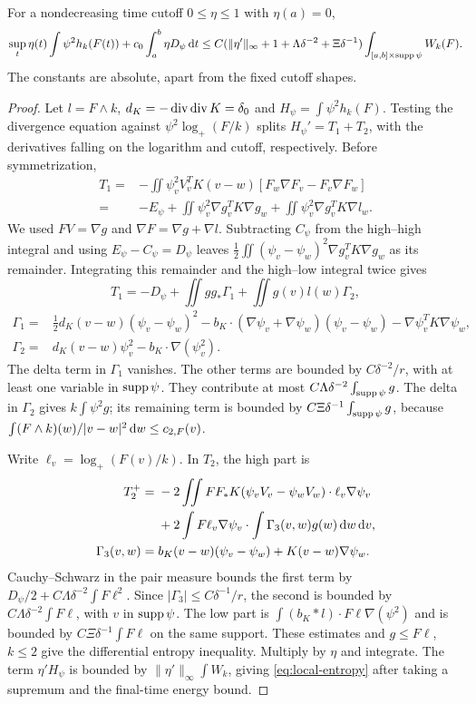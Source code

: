 \begin{lemma}\label{lem:local-entropy}
For a nondecreasing time cutoff $0\le\eta\le1$ with $\eta(a)=0$,
\begin{equation}\label{eq:local-entropy}
 \sup_t\eta(t)\int\psi^2h_k(F(t))
 +c_0\int_a^b\eta D_\psi\,\mathrm dt
 \le C(\|\eta'\|_\infty+1+\Lambda\delta^{-2}+\Xi\delta^{-1})
 \int_{[a,b]\times\operatorname{supp}\psi}W_k(F).
\end{equation}
The constants are absolute, apart from the fixed cutoff shapes.
\end{lemma}
\begin{proof}
Let $l=F\wedge k$, $d_K=-\operatorname{div}\operatorname{div} K=\delta_0$ and $H_\psi=\int\psi^2h_k(F)$. Testing the divergence equation against $\psi^2\log_+(F/k)$ splits $H_\psi'=T_1+T_2$, with the derivatives falling on the logarithm and cutoff, respectively. Before symmetrization,
\begin{align*}
 T_1={}&-\iint\psi_v^2 V_v^TK(v-w)
       [F_w\nabla F_v-F_v\nabla F_w]\\
 ={}&-E_\psi+\iint\psi_v^2\nabla g_v^TK\nabla g_w
             +\iint\psi_v^2\nabla g_v^TK\nabla l_w.
\end{align*}
We used $FV=\nabla g$ and $\nabla F=\nabla g+\nabla l$. Subtracting $C_\psi$ from the high--high integral and using $E_\psi-C_\psi=D_\psi$ leaves $\tfrac12\iint(\psi_v-\psi_w)^2\nabla g_v^TK\nabla g_w$ as its remainder. Integrating this remainder and the high--low integral twice gives
\[
 T_1=-D_\psi+\iint gg_*\Gamma_1+\iint g(v)l(w)\Gamma_2,
\]
\begin{align*}
 \Gamma_1={}&\tfrac12 d_K(v-w)(\psi_v-\psi_w)^2
 -b_K\cdot(\nabla\psi_v+\nabla\psi_w)(\psi_v-\psi_w)
 -\nabla\psi_v^TK\nabla\psi_w,\\
 \Gamma_2={}&d_K(v-w)\psi_v^2-b_K\cdot\nabla(\psi_v^2).
\end{align*}
The delta term in $\Gamma_1$ vanishes. The other terms are bounded by $C\delta^{-2}/r$, with at least one variable in $\operatorname{supp}\psi$. They contribute at most $C\Lambda\delta^{-2}\int_{\operatorname{supp}\psi}g$. The delta in $\Gamma_2$ gives $k\int\psi^2g$; its remaining term is bounded by
$C\Xi\delta^{-1}\int_{\operatorname{supp}\psi}g$, because
$\int(F\wedge k)(w)/|v-w|^2\,\mathrm dw\le c_{2,F}(v)$.

Write $\ell_v=\log_+(F(v)/k)$. In $T_2$, the high part is
\begin{align*}
 T_2^+={}&-2\iint FF_*K(\psi_vV_v-\psi_wV_w)\cdot\ell_v\nabla\psi_v\\
 &+2\int F\ell_v\nabla\psi_v\cdot\int\Gamma_3(v,w)g(w)\,\mathrm dw\,\mathrm dv,\\
 \Gamma_3(v,w)={}&b_K(v-w)(\psi_v-\psi_w)+K(v-w)\nabla\psi_w.
\end{align*}
Cauchy--Schwarz in the pair measure bounds the first term by
$D_\psi/2+C\Lambda\delta^{-2}\int F\ell^2$.
Since $|\Gamma_3|\le C\delta^{-1}/r$, the second is bounded by
$C\Lambda\delta^{-2}\int F\ell$, with $v$ in $\operatorname{supp}\psi$.
The low part is $\int(b_K*l)\cdot F\ell\nabla(\psi^2)$ and is bounded by $C\Xi\delta^{-1}\int F\ell$ on the same support. These estimates and $g\le F\ell$, $k\le2$ give the differential entropy inequality. Multiply by $\eta$ and integrate. The term $\eta'H_\psi$ is bounded by $\|\eta'\|_\infty\int W_k$, giving \eqref{eq:local-entropy} after taking a supremum and the final-time energy bound.


\end{proof}
